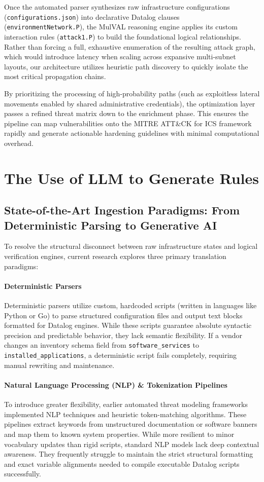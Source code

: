 \documentclass[target=mst,aauheader=aics,style=]{thud}
\begin{document}
Once the automated parser synthesizes raw infrastructure configurations (\texttt{configurations.json}) into declarative Datalog clauses (\texttt{environmentNetwork.P}), the MulVAL reasoning engine applies its custom interaction rules (\texttt{attack1.P}) to build the foundational logical relationships. Rather than forcing a full, exhaustive enumeration of the resulting attack graph, which would introduce latency when scaling across expansive multi-subnet layouts, our architecture utilizes heuristic path discovery to quickly isolate the most critical propagation chains. 

By prioritizing the processing of high-probability paths (such as exploitless lateral movements enabled by shared administrative credentials), the optimization layer passes a refined threat matrix down to the enrichment phase. This ensures the pipeline can map vulnerabilities onto the MITRE ATT&CK for ICS framework rapidly and generate actionable hardening guidelines with minimal computational overhead.

\section{The Use of LLM to Generate Rules}

\subsection{State-of-the-Art Ingestion Paradigms: From Deterministic Parsing to Generative AI}
To resolve the structural disconnect between raw infrastructure states and logical verification engines, current research explores three primary translation paradigms:

\paragraph{Deterministic Parsers}
Deterministic parsers utilize custom, hardcoded scripts (written in languages like Python or Go) to parse structured configuration files and output text blocks formatted for Datalog engines. While these scripts guarantee absolute syntactic precision and predictable behavior, they lack semantic flexibility. If a vendor changes an inventory schema field from \texttt{software\_services} to \texttt{installed\_applications}, a deterministic script fails completely, requiring manual rewriting and maintenance.

\paragraph{Natural Language Processing (NLP) \& Tokenization Pipelines}
To introduce greater flexibility, earlier automated threat modeling frameworks implemented NLP techniques and heuristic token-matching algorithms. These pipelines extract keywords from unstructured documentation or software banners and map them to known system properties. While more resilient to minor vocabulary updates than rigid scripts, standard NLP models lack deep contextual awareness. They frequently struggle to maintain the strict structural formatting and exact variable alignments needed to compile executable Datalog scripts successfully.
\end{document}
